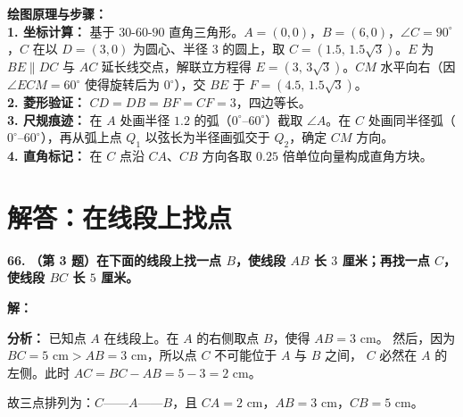 \vspace{0.4cm}
{\small\color{blue!70!black}
\textbf{绘图原理与步骤：}\\
\textbf{1. 坐标计算：} 基于 $30$-$60$-$90$ 直角三角形。$A = (0,0)$，$B = (6,0)$，$\angle C = 90^\circ$，$C$ 在以 $D = (3,0)$ 为圆心、半径 $3$ 的圆上，取 $C = (1.5,\,1.5\sqrt{3})$。$E$ 为 $BE \parallel DC$ 与 $AC$ 延长线交点，解联立方程得 $E = (3,\,3\sqrt{3})$。$CM$ 水平向右（因 $\angle ECM = 60^\circ$ 使得旋转后为 $0^\circ$），交 $BE$ 于 $F = (4.5,\,1.5\sqrt{3})$。\\
\textbf{2. 菱形验证：} $CD = DB = BF = CF = 3$，四边等长。\\
\textbf{3. 尺规痕迹：} 在 $A$ 处画半径 $1.2$ 的弧（$0^\circ$--$60^\circ$）截取 $\angle A$。在 $C$ 处画同半径弧（$0^\circ$--$60^\circ$），再从弧上点 $Q_1$ 以弦长为半径画弧交于 $Q_2$，确定 $CM$ 方向。\\
\textbf{4. 直角标记：} 在 $C$ 点沿 $CA$、$CB$ 方向各取 $0.25$ 倍单位向量构成直角方块。
}

\newpage



\newpage

\section{解答：在线段上找点}

\vspace{0.6cm}

\textbf{\LARGE 66.} \textbf{（第 3 题）在下面的线段上找一点 $B$，使线段 $AB$ 长 $3$ 厘米；再找一点 $C$，使线段 $BC$ 长 $5$ 厘米。}

\vspace{0.4cm}
\textbf{解：}

\vspace{0.2cm}
\textbf{分析：} 已知点 $A$ 在线段上。在 $A$ 的右侧取点 $B$，使得 $AB = 3\text{ cm}$。
然后，因为 $BC = 5\text{ cm} > AB = 3\text{ cm}$，所以点 $C$ 不可能位于 $A$ 与 $B$ 之间，
$C$ 必然在 $A$ 的左侧。此时 $AC = BC - AB = 5 - 3 = 2\text{ cm}$。

故三点排列为：$C$——$A$——$B$，且 $CA = 2\text{ cm}$，$AB = 3\text{ cm}$，$CB = 5\text{ cm}$。

\vspace{0.4cm}

\begin{center}
\end{center}

